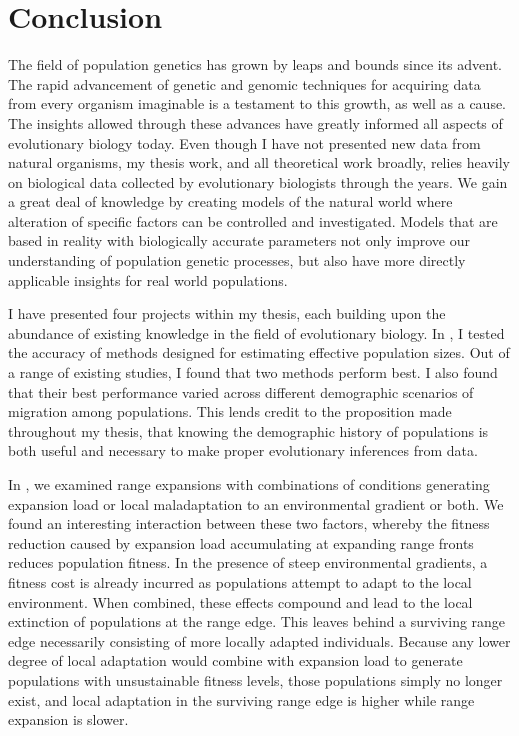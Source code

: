 \chapter{Conclusion}
\label{chap:conclusions}

The field of population genetics has grown by leaps and bounds since its advent. The rapid advancement of genetic and genomic techniques for acquiring data from every organism imaginable is a testament to this growth, as well as a cause. The insights allowed through these advances have greatly informed all aspects of evolutionary biology today. Even though I have not presented new data from natural organisms, my thesis work, and all theoretical work broadly, relies heavily on biological data collected by evolutionary biologists through the years. We gain a great deal of knowledge by creating models of the natural world where alteration of specific factors can be controlled and investigated. Models that are based in reality with biologically accurate parameters not only improve our understanding of population genetic processes, but also have more directly applicable insights for real world populations.

I have presented four projects within my thesis, each building upon the abundance of existing knowledge in the field of evolutionary biology. In , I tested the accuracy of methods designed for estimating effective population sizes. Out of a range of existing studies, I found that two methods perform best. I also found that their best performance varied across different demographic scenarios of migration among populations. This lends credit to the proposition made throughout my thesis, that knowing the demographic history of populations is both useful and necessary to make proper evolutionary inferences from data.

In , we examined range expansions with combinations of conditions generating expansion load or local maladaptation to an environmental gradient or both. We found an interesting interaction between these two factors, whereby the fitness reduction caused by expansion load accumulating at expanding range fronts reduces population fitness. In the presence of steep environmental gradients, a fitness cost is already incurred as populations attempt to adapt to the local environment. When combined, these effects compound and lead to the local extinction of populations at the range edge. This leaves behind a surviving range edge necessarily consisting of more locally adapted individuals. Because any lower degree of local adaptation would combine with expansion load to generate populations with unsustainable fitness levels, those populations simply no longer exist, and local adaptation in the surviving range edge is higher while range expansion is slower. 

